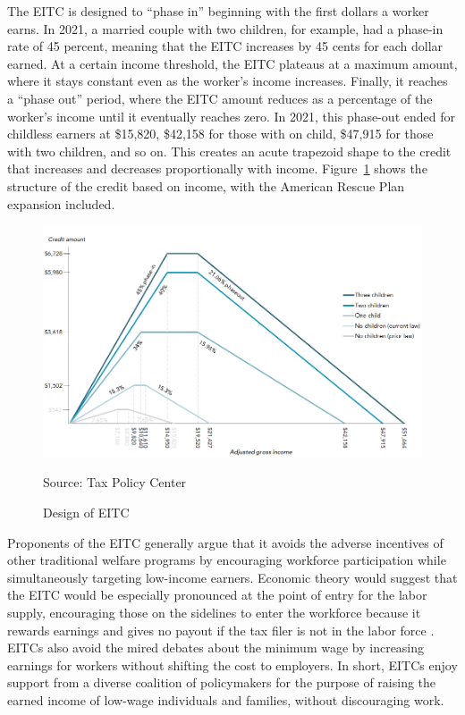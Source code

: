 \documentclass{article}
\begin{document}
The EITC is designed to “phase in” beginning with the first dollars a worker earns. In 2021, a married couple with two children, for example, had a phase-in rate of 45 percent, meaning that the EITC increases by 45 cents for each dollar earned. At a certain income threshold, the EITC plateaus at a maximum amount, where it stays constant even as the worker’s income increases. Finally, it reaches a “phase out” period, where the EITC amount reduces as a percentage of the worker’s income until it eventually reaches zero. In 2021, this phase-out ended for childless earners at \$15,820, \$42,158 for those with on child, \$47,915 for those with two children, and so on. This creates an acute trapezoid shape to the credit that increases and decreases proportionally with income. Figure~\ref{fig:tax} shows the structure of the credit based on income, with the American Rescue Plan expansion included. 

 \begin{figure}[H]
    \caption{Design of EITC}
    \begin{center}
        \includegraphics[width=.85\textwidth]{eitc_design}
    \end{center}
	\footnotesize
    \label{fig:tax}{Source: Tax Policy Center}
\end{figure}

Proponents of the EITC generally argue that it avoids the adverse incentives of other traditional welfare programs by encouraging workforce participation while simultaneously targeting low-income earners. Economic theory would suggest that the EITC would be especially pronounced at the point of entry for the labor supply, encouraging those on the sidelines to enter the workforce because it rewards earnings and gives no payout if the tax filer is not in the labor force \citep{eissa2006behavioral}. EITCs also avoid the mired debates about the minimum wage by increasing earnings for workers without shifting the cost to employers. In short, EITCs enjoy support from a diverse coalition of policymakers for the purpose of raising the earned income of low-wage individuals and families, without discouraging work.
\end{document}
